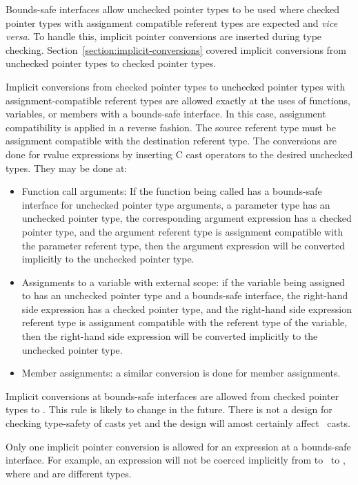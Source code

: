 Bounds-safe interfaces allow unchecked pointer types to be used
where checked pointer types with assignment compatible referent types are
expected and {\it vice versa}.
To handle this, implicit pointer conversions are inserted during type checking.
Section~\ref{section:implicit-conversions} covered implicit conversions from unchecked pointer types to checked pointer types.

Implicit conversions from checked pointer types to unchecked pointer types
with assignment-compatible referent types are allowed exactly at the uses of functions,
variables, or members with a  bounds-safe interface.  In this case, assignment
compatibility is applied in a reverse fashion.  The source referent type must be
assignment compatible with the destination referent type.  The conversions are done for rvalue expressions by inserting C cast operators to the desired unchecked types.
They may be done at:
\begin{itemize}
\item Function call arguments: If the function being called has a
      bounds-safe interface for unchecked pointer type arguments, a parameter
      type has an unchecked pointer type, the corresponding argument expression
      has a checked pointer type, and the argument referent type is assignment
      compatible with the parameter referent type, then the argument expression
      will be converted implicitly to the unchecked pointer type.
\item Assignments to a variable with external scope: if the variable being
     assigned to has an unchecked pointer type and a bounds-safe interface, the
     right-hand side expression has a checked pointer type, and the right-hand
     side expression referent type is assignment compatible with the referent
     type of the variable, then the right-hand side expression will be converted
     implicitly to the unchecked pointer type.
\item
   Member assignments: a similar conversion is done for member assignments.
\end{itemize}

Implicit conversions at bounds-safe interfaces are allowed from checked pointer types to
\uncheckedptrvoid.  This rule is likely to change in the future.  There is not a  design for
checking type-safety of casts yet and the design will amost certainly affect 
\uncheckedptrvoid\ casts.

Only one implicit pointer conversion is allowed for an expression at a bounds-safe
interface.  For example, an expression will not be
coerced implicitly from  to \uncheckedptrvoid\ to
, where  and  are different types.

